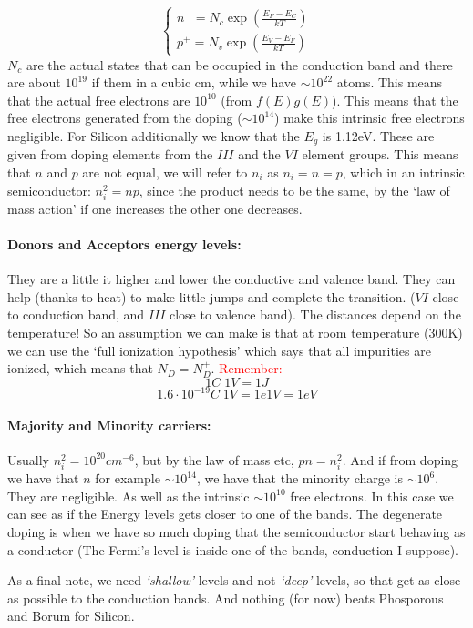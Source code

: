 \begin{equation}
    \left\{
        \begin{aligned}
            n^- = N_c \exp\left(\frac{E_F - E_C}{kT}\right) \\
            p^+ = N_v \exp\left(\frac{E_V - E_F}{kT}\right) 
        \end{aligned}
    \right.
\end{equation}
$N_c$ are the actual states that can be occupied in the conduction band and there are about $10^{19}$ if them in a cubic cm, while we have $\sim 10^{22}$ atoms. This means that the actual free electrons are $10^{10}$ (from $f(E)g(E)$). This means that the free electrons generated from the doping ($\sim10^{14}$) make this intrinsic free electrons negligible. For Silicon additionally we know that the $E_g$ is 1.12eV.
These are given from doping elements from the $III$ and the $VI$ element groups. This means that $n$ and $p$ are not equal, we will refer to $n_i$ as $n_i = n = p$, which in an intrinsic semiconductor: $n_i^2 = np$, since the product needs to be the same, by the `law of mass action' if one increases the other one decreases.

\paragraph{Donors and Acceptors energy levels:} They are a little it higher and lower the conductive and valence band. They can help (thanks to heat) to make little jumps and complete the transition. ($VI$ close to conduction band, and $III$ close to valence band). The distances depend on the temperature! So an assumption we can make is that at room temperature (300K) we can use the `full ionization hypothesis' which says that all impurities are ionized, which means that $N_D = N_D^+$. \textcolor{red}{Remember:}
\begin{equation}
    1C\;1V = 1J
\end{equation}
\begin{equation}
    1.6\cdot10^{-19}C\;1V = 1e1V = 1eV
\end{equation}

\paragraph{Majority and Minority carriers:} Usually $n_i^2 = 10^{20} cm^{-6}$, but by the law of mass etc, $pn = n_i^2$. And if from doping we have that $n$ for example $\sim10^{14}$, we have that the minority charge is $\sim10^{6}$. They are negligible. As well as the intrinsic $\sim10^{10}$ free electrons. In this case we can see as if the Energy levels gets closer to one of the bands. The degenerate doping is when we have so much doping that the semiconductor start behaving as a conductor (The Fermi's level is inside one of the bands, conduction I suppose).

As a final note, we need \textit{`shallow'} levels and not \textit{`deep'} levels, so that get as close as possible to the conduction bands. And nothing (for now) beats Phosporous and Borum for Silicon. 